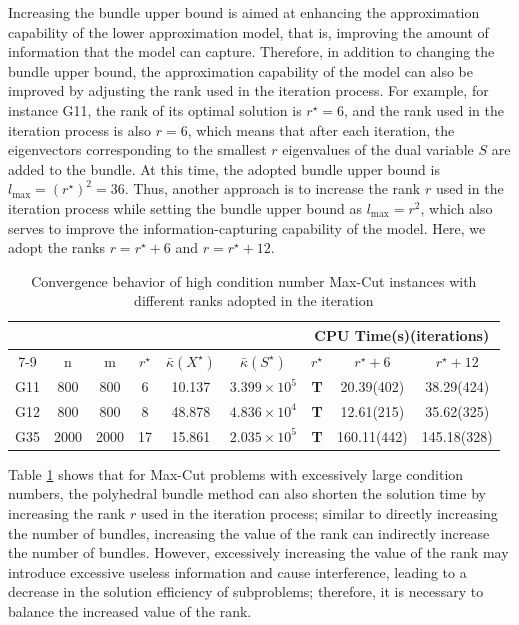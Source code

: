 \documentclass{jcmlatex}
\begin{document}
Increasing the bundle upper bound is aimed at enhancing the approximation capability of the lower approximation model, that is, improving the amount of information that the model can capture. Therefore, in addition to changing the bundle upper bound, the approximation capability of the model can also be improved by adjusting the rank used in the iteration process. For example, for instance G11, the rank of its optimal solution is \( r^{\star}=6 \), and the rank used in the iteration process is also \( r=6 \), which means that after each iteration, the eigenvectors corresponding to the smallest \( r \) eigenvalues of the dual variable \( S \) are added to the bundle. At this time, the adopted bundle upper bound is \( l_{\max}=(r^{\star})^2=36 \). Thus, another approach is to increase the rank \( r \) used in the iteration process while setting the bundle upper bound as \( l_{\max}=r^2 \), which also serves to improve the information-capturing capability of the model. Here, we adopt the ranks \( r=r^{\star}+6 \) and \( r=r^{\star}+12 \).
\begin{table}
    \centering
    \caption{Convergence behavior of high condition number Max-Cut instances with different ranks adopted in the iteration}
    \label{t10}
    \setlength\tabcolsep{0.9pt}
    \begin{tabular*}{\textwidth}{@{\extracolsep\fill}ccccccccc}
\toprule  
~&~&~&~&~&~& \multicolumn{3}{c}{CPU Time(s)(iterations)} \\
\cmidrule{7-9}
 & n &m& \(r^{\star}\) &\(\bar{\kappa}(X^{\star})\)&\(\bar{\kappa}(S^{\star})\)& \(r^{\star}\) & \(r^{\star}+6\)&\(r^{\star}+12\)\\ 
\midrule 
    G11 & 800&800 &6&10.137 &\(3.399\times 10^5\)  &\textbf{T} &20.39(402)&38.29(424) \\
    G12 & 800&800 &8&48.878 &\(4.836\times 10^4\)  &\textbf{T} &12.61(215)&35.62(325) \\ 
    G35 & 2000&2000 &17&15.861 &\(2.035\times 10^5\) &\textbf{T} &160.11(442)&145.18(328) \\
\hline
\end{tabular*}
\end{table}

Table \ref{t10} shows that for Max-Cut problems with excessively large condition numbers, the polyhedral bundle method can also shorten the solution time by increasing the rank \(r\) used in the iteration process; similar to directly increasing the number of bundles, increasing the value of the rank can indirectly increase the number of bundles. However, excessively increasing the value of the rank may introduce excessive useless information and cause interference, leading to a decrease in the solution efficiency of subproblems; therefore, it is necessary to balance the increased value of the rank.
\end{document}
